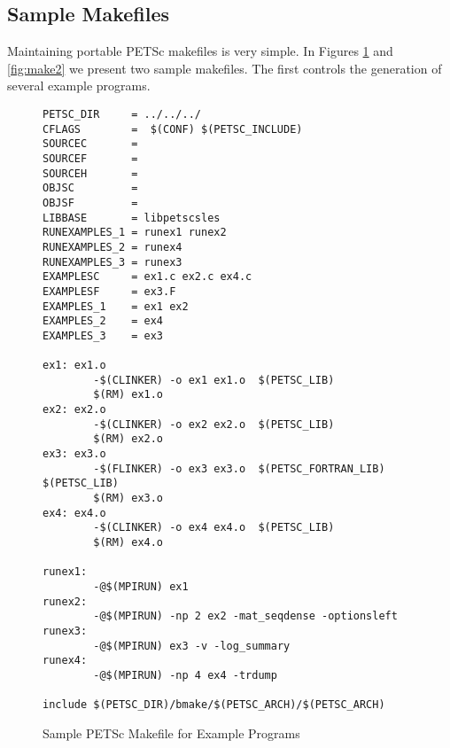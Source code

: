 \subsection{Sample Makefiles}

Maintaining portable PETSc makefiles is very simple. In Figures
\ref{fig:make1} and \ref{fig:make2} we present two sample makefiles. 
The first controls the generation of several example programs. 

\begin{figure}[H]
\begin{verbatim}
PETSC_DIR     = ../../../
CFLAGS        =  $(CONF) $(PETSC_INCLUDE)
SOURCEC       = 
SOURCEF       =
SOURCEH       =
OBJSC         =
OBJSF         =
LIBBASE       = libpetscsles
RUNEXAMPLES_1 = runex1 runex2
RUNEXAMPLES_2 = runex4
RUNEXAMPLES_3 = runex3
EXAMPLESC     = ex1.c ex2.c ex4.c
EXAMPLESF     = ex3.F
EXAMPLES_1    = ex1 ex2
EXAMPLES_2    = ex4
EXAMPLES_3    = ex3

ex1: ex1.o 
        -$(CLINKER) -o ex1 ex1.o  $(PETSC_LIB)
        $(RM) ex1.o
ex2: ex2.o 
        -$(CLINKER) -o ex2 ex2.o  $(PETSC_LIB)
        $(RM) ex2.o
ex3: ex3.o 
        -$(FLINKER) -o ex3 ex3.o  $(PETSC_FORTRAN_LIB) $(PETSC_LIB)
        $(RM) ex3.o
ex4: ex4.o 
        -$(CLINKER) -o ex4 ex4.o  $(PETSC_LIB)
        $(RM) ex4.o

runex1:
        -@$(MPIRUN) ex1
runex2:
        -@$(MPIRUN) -np 2 ex2 -mat_seqdense -optionsleft
runex3:
        -@$(MPIRUN) ex3 -v -log_summary
runex4:
        -@$(MPIRUN) -np 4 ex4 -trdump

include $(PETSC_DIR)/bmake/$(PETSC_ARCH)/$(PETSC_ARCH)
\end{verbatim}
\caption{Sample PETSc Makefile for Example Programs}
\label{fig:make1}
\end{figure}

